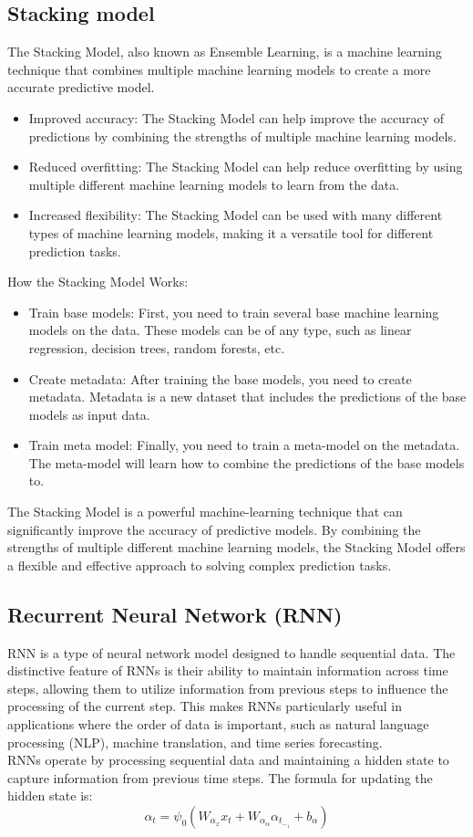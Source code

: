 \documentclass{ieeeojies}
\begin{document}
\subsection{Stacking model} 
The Stacking Model, also known as Ensemble Learning, is a machine learning technique that combines multiple machine learning models to create a more accurate predictive model.
\begin{itemize}
    \item Improved accuracy: The Stacking Model can help improve the accuracy of predictions by combining the strengths of multiple machine learning models.
    \item Reduced overfitting: The Stacking Model can help reduce overfitting by using multiple different machine learning models to learn from the data.
    \item Increased flexibility: The Stacking Model can be used with many different types of machine learning models, making it a versatile tool for different prediction tasks.
\end{itemize}
How the Stacking Model Works:
\begin{itemize}
    \item Train base models: First, you need to train several base machine learning models on the data. These models can be of any type, such as linear regression, decision trees, random forests, etc.
    \item  Create metadata: After training the base models, you need to create metadata. Metadata is a new dataset that includes the predictions of the base models as input data.
    \item Train meta model: Finally, you need to train a meta-model on the metadata. The meta-model will learn how to combine the predictions of the base models to.
\end{itemize}
The Stacking Model is a powerful machine-learning technique that can significantly improve the accuracy of predictive models. By combining the strengths of multiple different machine learning models, the Stacking Model offers a flexible and effective approach to solving complex prediction tasks.

\subsection{Recurrent Neural Network (RNN)}
RNN is a type of neural network model designed to handle sequential data. The distinctive feature of RNNs is their ability to maintain information across time steps, allowing them to utilize information from previous steps to influence the processing of the current step. This makes RNNs particularly useful in applications where the order of data is important, such as natural language processing (NLP), machine translation, and time series forecasting. \cite{zargar2021introduction}\\
RNNs operate by processing sequential data and maintaining a hidden state to capture information from previous time steps. The formula for updating the hidden state is:
\[ \alpha_t=\psi_0(W_\alpha_xx_t + W_\alpha_\alpha\alpha_t_-_1 + b_\alpha) \]
\end{document}
